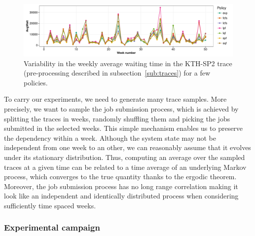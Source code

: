 \documentclass[sigconf]{acmart}
\begin{document}
\begin{figure}[ht]
  \centering
  \includegraphics[scale=0.6]{figures/variability.pdf}
  \caption{Variability in the weekly average waiting time in the KTH-SP2 trace (pre-processing described in subsection~\ref{sub:traces}) for a few policies.}
  \label{fig:mosn}
\end{figure}



To carry our experiments, we need to generate many trace samples. More precisely, we want
to sample the job submission process, which is achieved by splitting the traces in weeks,
randomly shuffling them and picking the jobs submitted in the selected weeks.  This simple
mechanism enables us to preserve the dependency within a week. Although the system state
may not be independent from one week to an other, we can reasonably assume that it evolves
under its stationary distribution. Thus, computing an average over the sampled traces at a
given time can be related to a time average of an underlying Markov process, which
converges to the true quantity thanks to the ergodic theorem.  Moreover, the job
submission process has no long range correlation making it look like an independent and
identically distributed process when considering sufficiently time spaced weeks.

\subsubsection{Experimental campaign}
\end{document}
